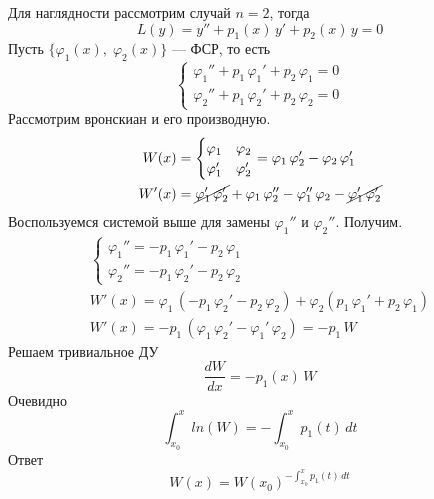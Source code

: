 \begin{Proof}
    Для наглядности рассмотрим случай $n = 2$, тогда
    \[
        L(y) = y'' + p_1(x)\,y' + p_2(x)\,y = 0
    \]
    Пусть $\{\varphi_1(x),\; \varphi_2(x)\}$ --- ФСР, то есть
    \[
        \begin{cases}
            \varphi_1'' + p_1\,\varphi_1' + p_2\,\varphi_1 = 0\\
            \varphi_2'' + p_1\,\varphi_2' + p_2\,\varphi_2 = 0
        \end{cases}
    \]
    Рассмотрим вронскиан и его производную.
    \begin{align*}
        W(x) &= \begin{cases}
           \varphi_1 & \varphi_2\\
           \varphi_1' & \varphi_2'
        \end{cases} = \varphi_1\,\varphi_2' - \varphi_2\,\varphi_1'\\
        W'(x) &= \cancel{\varphi_1'\,\varphi_2'} + \varphi_1\,\varphi_2'' - \varphi_1''\,\varphi_2 - \cancel{\varphi_1'\,\varphi_2'}
    \end{align*}
    Воспользуемся системой выше для замены $\varphi_1''$ и $\varphi_2''$. Получим.
    \begin{gather*}
        \begin{cases}
            \varphi_1'' = - p_1\,\varphi_1' - p_2\,\varphi_1\\
            \varphi_2'' = - p_1\,\varphi_2' - p_2\,\varphi_2
        \end{cases}\\
         W'(x) = \varphi_1\, (- p_1\,\varphi_2' - p_2\,\varphi_2) + \varphi_2(p_1\,\varphi_1' + p_2\,\varphi_1)\\
         W'(x) = - p_1\,(\varphi_1\,\varphi_2' - \varphi_1'\,\varphi_2) = - p_1\,W
    \end{gather*}
    Решаем тривиальное ДУ
    \[
        \frac{dW}{dx} = -p_1(x)\,W
    \]
    Очевидно
    \[
        \int_{x_0}^x ln(W) = - \int_{x_0}^x p_1(t)\,dt
    \]
    Ответ
    \[
        W(x) = W(x_0)^{- \int_{x_0}^x p_1(t)\,dt}
    \]
\end{Proof}